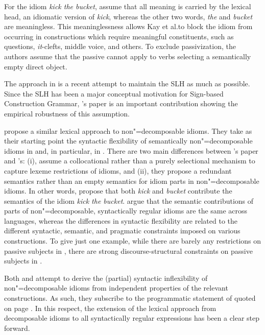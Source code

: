 \documentclass[output=paper
	        ,collection
	        ,collectionchapter
 	        ,biblatex
                ,babelshorthands
                ,newtxmath
                ,draftmode
                ,colorlinks, citecolor=brown
]{langscibook}
\begin{document}
For the idiom \emph{kick the bucket}, \citet{KSF2015a} assume that all meaning is carried by the lexical head, an idiomatic version of \emph{kick}, whereas the other two words, \emph{the} and \emph{bucket} are meaningless. 
This meaninglessness allows Kay et al.\@ to block the idiom from occurring in constructions which require meaningful constituents, such as questions, \emph{it}-clefts, middle voice, and others. 
To exclude passivization, the authors assume that the  passive cannot apply to verbs selecting a semantically empty direct object.

The approach in \citet{KSF2015a} is a recent attempt to maintain the SLH as much as possible. 
Since the SLH has been a major conceptual motivation for Sign-based Construction Grammar, \citeauthor{KSF2015a}'s paper is an important contribution showing the empirical robustness of this assumption.

\citet{Bargmann:Sailer:18} propose a similar lexical approach to non"=de\-com\-pos\-able idioms. 
They take as their starting point the syntactic flexibility of semantically non"=decomposable idioms in  and, in particular, in .
There are two main differences between \citeauthor{KSF2015a}'s paper and \citeauthor{Bargmann:Sailer:18}'s: (i), \citeauthor{Bargmann:Sailer:18} assume a collocational rather than a purely selectional mechanism to capture lexeme restrictions of idioms, and (ii), they propose a redundant semantics rather than an empty semantics for idiom parts in non"=decomposable idioms. In other words, \citet{Bargmann:Sailer:18} propose that both \emph{kick} and \emph{bucket} contribute the semantics of the idiom \emph{kick the bucket}. 
\citeauthor{Bargmann:Sailer:18} argue that the semantic contributions of parts of non"=decomposable, syntactically regular idioms are the same across languages, whereas the differences in syntactic flexibility are related to the different syntactic, semantic, and pragmatic constraints imposed on various constructions. 
To give just one example, while there are barely any restrictions on passive subjects in , there are strong discourse-structural constraints on passive subjects in .

Both \citet{KSF2015a} and \citet{Bargmann:Sailer:18} attempt to derive the (partial) syntactic inflexibility of non"=decomposable idioms from independent properties of the relevant constructions. 
As such, they subscribe to the programmatic statement of \citet{NSW94a} quoted on page \pageref{NSW-quote}.  
In this respect, the extension of the lexical approach from decomposable idioms to all syntactically regular expressions has been a clear step forward. 
\end{document}
